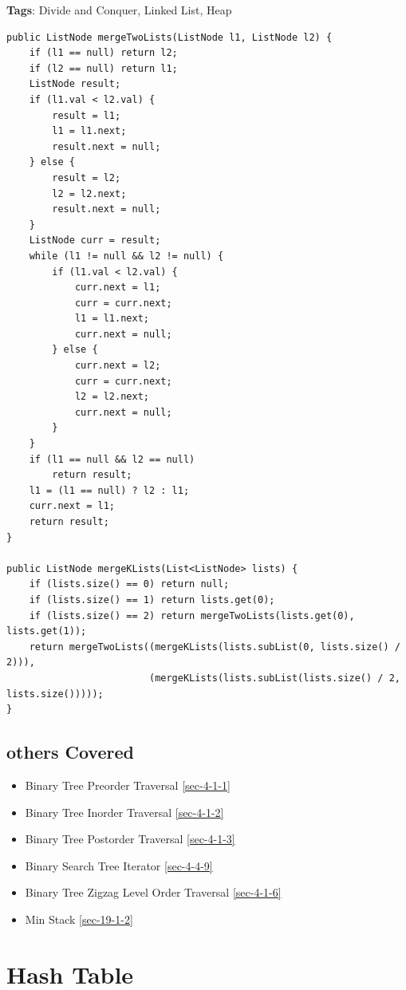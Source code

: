 \documentclass[12pt]{book}
\begin{document}
\textbf{Tags}: Divide and Conquer, Linked List, Heap
\lstset{language=java,label= ,caption= ,numbers=none}
\begin{lstlisting}
public ListNode mergeTwoLists(ListNode l1, ListNode l2) {
    if (l1 == null) return l2;
    if (l2 == null) return l1;
    ListNode result;
    if (l1.val < l2.val) {
        result = l1;
        l1 = l1.next;
        result.next = null;
    } else {
        result = l2;
        l2 = l2.next;
        result.next = null;
    }
    ListNode curr = result;
    while (l1 != null && l2 != null) {
        if (l1.val < l2.val) {
            curr.next = l1;
            curr = curr.next;
            l1 = l1.next;
            curr.next = null;
        } else {
            curr.next = l2;
            curr = curr.next;
            l2 = l2.next;
            curr.next = null;
        }
    }
    if (l1 == null && l2 == null)
        return result;
    l1 = (l1 == null) ? l2 : l1;
    curr.next = l1;
    return result;
}

public ListNode mergeKLists(List<ListNode> lists) {
    if (lists.size() == 0) return null;
    if (lists.size() == 1) return lists.get(0);
    if (lists.size() == 2) return mergeTwoLists(lists.get(0), lists.get(1));
    return mergeTwoLists((mergeKLists(lists.subList(0, lists.size() / 2))),
                         (mergeKLists(lists.subList(lists.size() / 2, lists.size()))));
}
\end{lstlisting}

\section{others Covered}
\label{sec-5-5}
\begin{itemize}
\item Binary Tree Preorder Traversal
\ref{sec-4-1-1}
\item Binary Tree Inorder Traversal
\ref{sec-4-1-2}
\item Binary Tree Postorder Traversal
\ref{sec-4-1-3}
\item Binary Search Tree Iterator        
\ref{sec-4-4-9}
\item Binary Tree Zigzag Level Order Traversal
\ref{sec-4-1-6}
\item Min Stack
\ref{sec-19-1-2}
\end{itemize}

\chapter{Hash Table}
\label{sec-6}
\end{document}
